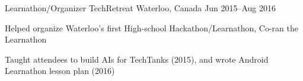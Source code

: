 \begin{cventries}
  \cventry
    {Learnathon/Organizer}
    {TechRetreat}
    {Waterloo, Canada}
    {Jun 2015--Aug 2016}
    {
      \begin{cvitems}
        \item {Helped organize Waterloo’s first High-school Hackathon/Learnathon, Co-ran the Learnathon}
        \item {Taught attendees to build AIs for TechTanks (2015), and wrote Android Learnathon lesson plan (2016)}
      \end{cvitems}
    }

\end{cventries}